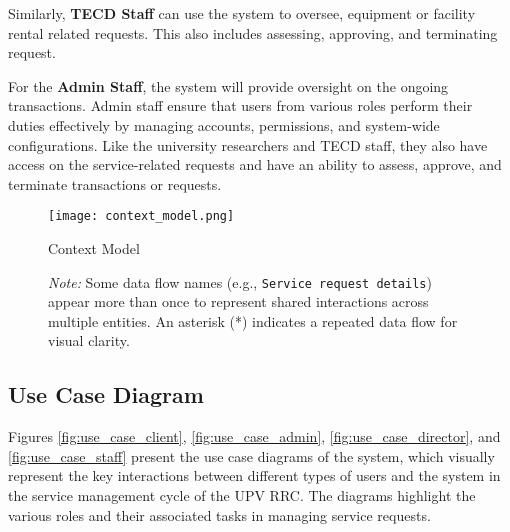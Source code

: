 Similarly, \textbf{TECD Staff} can use the system to oversee, equipment or facility rental related requests. This also includes assessing, approving, and terminating request. 

For the \textbf{Admin Staff}, the system will provide oversight on the ongoing transactions. Admin staff ensure that users from various roles perform their duties effectively by managing accounts, permissions, and system-wide configurations. Like the university researchers and TECD staff, they also have access on the service-related requests and have an ability to assess, approve, and terminate transactions or requests.

\newpage

\begin{figure}[h]
	\centering 
	\texttt{[image: context\_model.png]}
	\caption{Context Model}
	\caption*{\textit{Note:} Some data flow names (e.g., \texttt{Service request details}) appear more than once to represent shared interactions across multiple entities. An asterisk (*) indicates a repeated data flow for visual clarity.}
	\label{fig:context_model}
\end{figure}

\subsection{Use Case Diagram}

Figures \ref{fig:use_case_client}, \ref{fig:use_case_admin}, \ref{fig:use_case_director}, and \ref{fig:use_case_staff} present the use case diagrams of the system, which visually represent the key interactions between different types of users and the system in the service management cycle of the UPV RRC. The diagrams highlight the various roles and their associated tasks in managing service requests.

\newpage


